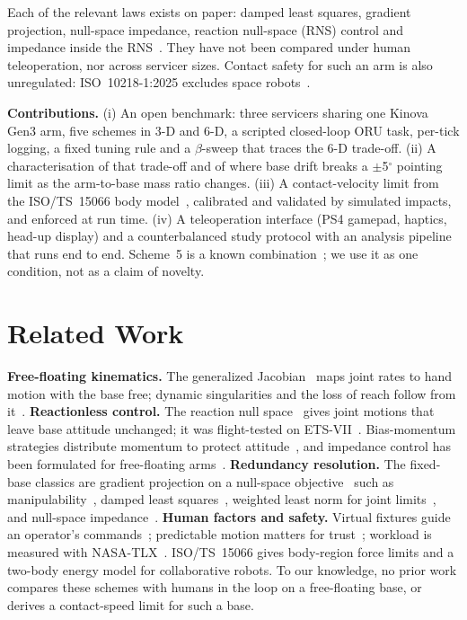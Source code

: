 \documentclass[conference]{IEEEtran}
\begin{document}
Each of the relevant laws exists on paper: damped least squares, gradient projection, null-space impedance,
reaction null-space (RNS) control and impedance inside the RNS~\cite{abiko2006,nakanishi2006}. They have not
been compared under human teleoperation, nor across servicer sizes. Contact safety for such an arm is
also unregulated: ISO~10218-1:2025 excludes space robots~\cite{iso10218}.

\textbf{Contributions.} (i) An open benchmark: three servicers sharing one Kinova Gen3 arm, five schemes in
3-D and 6-D, a scripted closed-loop ORU task, per-tick logging, a fixed tuning rule and a $\beta$-sweep that
traces the 6-D trade-off. (ii) A characterisation of that trade-off and of where base drift breaks a
$\pm$5$^\circ$ pointing limit as the arm-to-base mass ratio changes. (iii) A contact-velocity limit
from the ISO/TS~15066 body model~\cite{iso15066}, calibrated and validated by simulated impacts, and enforced
at run time. (iv) A teleoperation interface (PS4 gamepad, haptics, head-up display) and a
counterbalanced study protocol with an analysis pipeline that runs end to end. Scheme~5 is a known
combination~\cite{abiko2006,nenchev1999impact}; we use it as one condition, not as a claim of novelty.

\section{Related Work}
\textbf{Free-floating kinematics.} The generalized Jacobian~\cite{umetani1989} maps joint rates to hand
motion with the base free; dynamic singularities and the loss of reach follow from it~\cite{dubowsky1993}.
\textbf{Reactionless control.} The reaction null space~\cite{nenchev1999rns,nenchev1999impact} gives joint
motions that leave base attitude unchanged; it was flight-tested on ETS-VII~\cite{yoshida2001}. Bias-momentum
strategies distribute momentum to protect attitude~\cite{dimitrov2004}, and impedance control has been
formulated for free-floating arms~\cite{abiko2006,nakanishi2006}.
\textbf{Redundancy resolution.} The fixed-base classics are gradient projection on a null-space
objective~\cite{liegeois1977} such as manipulability~\cite{yoshikawa1985}, damped least
squares~\cite{wampler1986,deo1995}, weighted least norm for joint limits~\cite{chan1993}, and null-space
impedance~\cite{hogan1985}.
\textbf{Human factors and safety.} Virtual fixtures guide an operator's commands~\cite{rosenberg1993};
predictable motion matters for trust~\cite{dragan2013}; workload is measured with NASA-TLX~\cite{hart1988}.
ISO/TS~15066 gives body-region force limits and a two-body energy model for collaborative robots. To our
knowledge, no prior work compares these schemes with humans in the loop on a free-floating base, or derives a
contact-speed limit for such a base.
\end{document}

